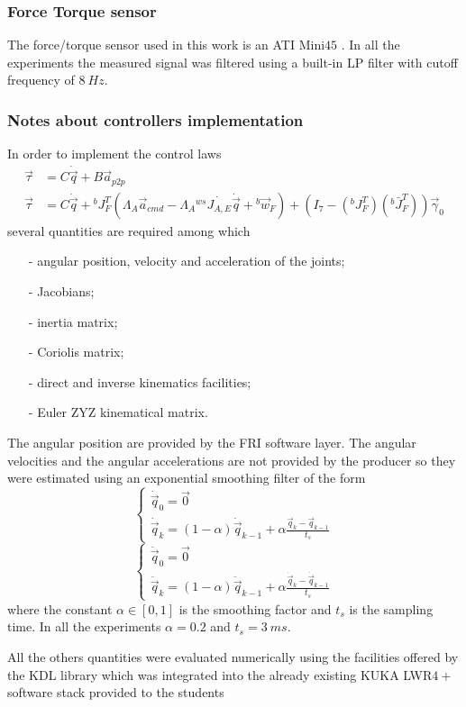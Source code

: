 \subsubsection{Force Torque sensor}
The force/torque sensor used in this work is an ATI Mini$45$
\cite{ATIIndustrialAutomation2017}.
In all the experiments the measured signal was filtered using a built-in
LP filter with cutoff frequency of $\SI{8}{Hz}$.

\subsubsection{Notes about controllers implementation}
In order to implement the control laws
\[
\begin{split}
  \vec{\tau} &= C \dot{\vec{q}} + B \vec{a}_{p2p}\\
  \vec{\tau} &= C \dot{\vec{q}} + {}^{b}J^{T}_{F} ( \Lambda_A \vec{a}_{cmd} - \Lambda_A {}^{ws} \dot{J_{A,E}} \dot{\vec{q}} + {}^b\vec{w}_{F}) +
  (I_7 - ({}^{b}J^{T}_{F}) ({}^{b} \bar{J}^{T}_{F})) \vec{\gamma}_{0}
\end{split}
\]
several quantities are required among which
\begin{itemize}
\item[-] angular position, velocity and acceleration of the joints;
\item[-] Jacobians;
\item[-] inertia matrix;
\item[-] Coriolis matrix;
\item[-] direct and inverse kinematics facilities;
\item[-] Euler ZYZ kinematical matrix.
\end{itemize}
\par
The angular position are provided by the FRI software layer.
The angular velocities and the angular accelerations are not provided by
the producer so they were estimated using an exponential smoothing filter of the 
form
\[
\begin{cases}
  \dot{\vec{q}}_0 = \vec{0} \\
  \dot{\vec{q}}_k = (1 - \alpha) \dot{\vec{q}}_{k-1} + \alpha \frac{\vec{q}_k - \vec{q}_{k-1}}{t_s}
\end{cases}
\]
\[
\begin{cases}
  \ddot{\vec{q}}_0 = \vec{0} \\
  \ddot{\vec{q}}_k = (1 - \alpha) \ddot{\vec{q}}_{k-1} + \alpha \frac{\dot{\vec{q}}_k - \dot{\vec{q}}_{k-1}}{t_s}
\end{cases}
\]
where the constant $\alpha \in [0, 1]$ is the smoothing factor and $t_s$ is the sampling time.
In all the experiments $\alpha = 0.2$ and $t_s = \SI{3}{ms}$.
\par
All the others quantities were evaluated numerically using the facilities offered by the KDL library which was
integrated into the already existing KUKA LWR$4+$ software stack provided to the students

